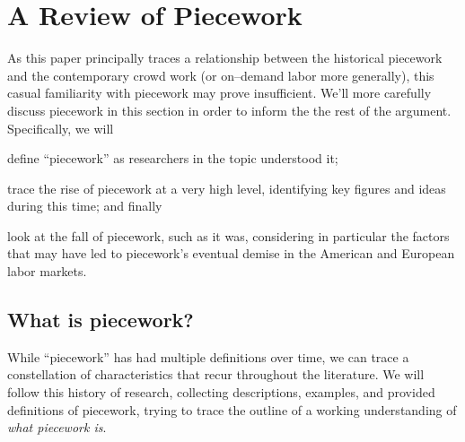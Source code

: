 \documentclass[trackingWork]{subfiles}
\begin{document}
\section{A Review of Piecework}

As this paper principally traces a relationship between
the historical piecework and the contemporary crowd work
(or on--demand labor more generally),
this casual familiarity with piecework may prove insufficient.
We'll more carefully discuss piecework in this section in order
to inform the the rest of the argument.
Specifically, we will
\begin{inlinelist}
  \item define ``piecework'' as researchers in the topic understood it;
  \item trace the rise of piecework at a very high level,
        identifying key figures and ideas during this time; and finally
  \item look at the fall of piecework, such as it was,
        considering in particular
        the factors that may have led to piecework's
        eventual demise in the American and European labor markets.
\end{inlinelist}




\subsection{What is piecework?}
While ``piecework'' has had multiple definitions over time,
we can trace a constellation of characteristics that recur throughout the literature.
We will follow this history of research, collecting
descriptions,
examples, and
provided definitions of piecework, trying
to trace the outline of a working understanding of
\textit{what piecework is}.
\end{document}
